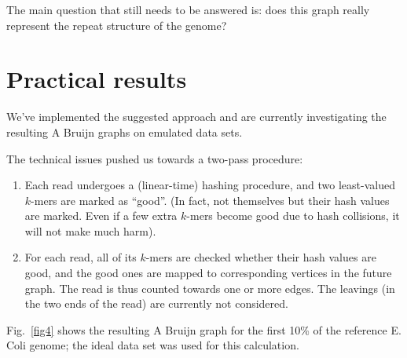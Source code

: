 \documentclass[12pt]{article}
\begin{document}
The main question that still needs to be answered is:
does this graph really represent the repeat structure of the genome?

\section{Practical results}

We've implemented the suggested approach and are currently investigating the resulting A Bruijn graphs
on emulated data sets.

The technical issues pushed us towards a two-pass procedure:
\begin{enumerate}
  \item Each read undergoes a (linear-time) hashing procedure, and two least-valued $k$-mers are marked as
  ``good''. (In fact, not themselves but their hash values are marked. Even if a few extra $k$-mers become
  good due to hash collisions, it will not make much harm).
  \item For each read, all of its $k$-mers are checked whether their hash values are good, and the good ones
  are mapped to corresponding vertices in the future graph. The read is thus counted towards one or more edges.
  The leavings (in the two ends of the read) are currently not considered.
\end{enumerate}

Fig.~\ref{fig4} shows the resulting A Bruijn graph for the first 10\% of the reference E. Coli genome; the ideal data set
was used for this calculation.
\end{document}
